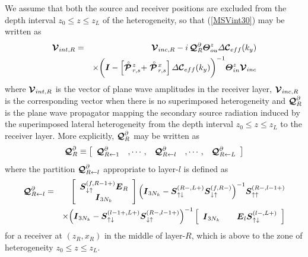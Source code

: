 We assume that both the source and receiver positions 
are excluded from the depth interval $z_0 \le z 
\le z_L$ of the heterogeneity, so that (\ref{MSVint30}) may be written as
\begin{eqnarray} \label{MSVint3}
{\CB  V}_{{int},R}&=&{\CB  V}_{{inc},R}-i\,
{\CB Q}^{\partial}_{R}  {\bmi \Theta}^{z}_{ou} 
{\mit \Delta}{\CB C}{}_{eff}(k_y)\nonumber\\
&&\times
\bigg({\bmi I} -  
\left[\rf{\CB P}\!{}^{z}_{r,s}+\rf{\CB P}\!{}^{x}_{r,s}\right]
{\mit \Delta}{\CB C}{}_{eff}(k_y)\bigg)^{-1} 
{\bmi \Theta}^{z}_{in}{\CB  V}_{{inc}}
\end{eqnarray}
where ${\CB  V}_{{int},R}$ is the vector of plane wave amplitudes in the 
receiver layer, ${\CB  V}_{{inc},R}$ is the corresponding vector when there 
is no superimposed heterogeneity and ${\CB Q}^{\partial}_{R}$ is the plane 
wave propagator mapping the secondary source radiation induced by the 
superimposed lateral heterogeneity 
from the depth interval $z_0 \le z 
\le z_L$ to the receiver layer. More explicitly,  ${\CB 
Q}^{\partial}_{R}$ may be written as
\[
{\CB Q}^{\partial}_{R} \equiv \left[\begin{array}{ccccc} 
{\CB Q}^{\partial}_{R\leftarrow 1}&
,\cdots,&{\CB Q}^{\partial}_{R\leftarrow l}&,\cdots,&
{\CB Q}^{\partial}_{R\leftarrow L}  \end{array}\right]
\]
where the partition ${\CB Q}^{\partial}_{R\leftarrow l}$ 
appropriate to layer-$l$ is defined as
\begin{eqnarray} \label{CBQldef}
{\CB Q}^{\partial}_{R\leftarrow l}&=&
\left[{\begin{array}{c}
{\bmi S}{}_{\downarrow\uparrow }^{   (f,{R-1}+)}{{\bmi E}}_{R}\\ 
{\bmi  I}_{ 3 N_k}\end{array}}\right]   
{\left({\bmi  I}_{ 3 N_k}-
{\bmi S}{}_{\uparrow\downarrow }^{ (R-,L+)} {\bmi S}{}_{\downarrow\uparrow 
}^{(f,R-)}\right)}^{-1} {\bmi S}{}_{\uparrow\uparrow }^{ (R-,{l-1}+)}\nonumber\\
&&\times
{\left({{\bmi  I}_{
3 N_k}-{\bmi S}{}_{\uparrow\downarrow }^{ ({l-1}+,L+)}
{{\bmi S}}{}_{\downarrow\uparrow }^{ (R-,{l-1}+)}}\right)}^{-1}\left[{\begin{array}{cc}
{\bmi  I}_{ 3 N_k}&\quad{{\bmi E}}_{l}{\bmi 
S}{}_{\uparrow\downarrow }^{(l-, 
L+)} \end{array}}\right]
\end{eqnarray}
for a receiver at $(z_R,x_R)$ in the middle of layer-$R$, 
which is above to the zone of heterogeneity $z_0 \le z \le z_L$.

